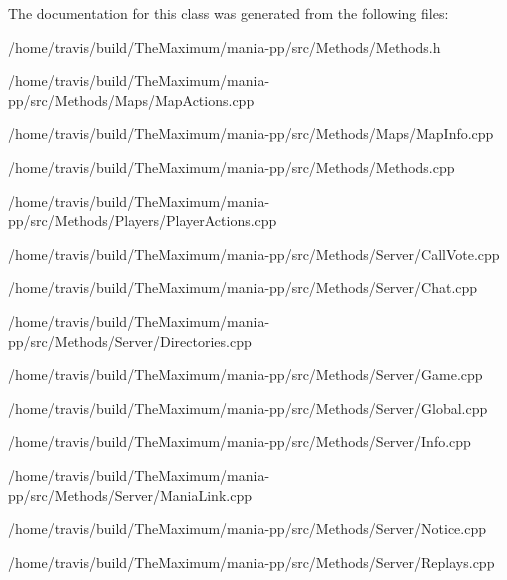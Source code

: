 The documentation for this class was generated from the following files\-:\begin{DoxyCompactItemize}
\item 
/home/travis/build/\-The\-Maximum/mania-\/pp/src/\-Methods/Methods.\-h\item 
/home/travis/build/\-The\-Maximum/mania-\/pp/src/\-Methods/\-Maps/Map\-Actions.\-cpp\item 
/home/travis/build/\-The\-Maximum/mania-\/pp/src/\-Methods/\-Maps/Map\-Info.\-cpp\item 
/home/travis/build/\-The\-Maximum/mania-\/pp/src/\-Methods/Methods.\-cpp\item 
/home/travis/build/\-The\-Maximum/mania-\/pp/src/\-Methods/\-Players/Player\-Actions.\-cpp\item 
/home/travis/build/\-The\-Maximum/mania-\/pp/src/\-Methods/\-Server/Call\-Vote.\-cpp\item 
/home/travis/build/\-The\-Maximum/mania-\/pp/src/\-Methods/\-Server/Chat.\-cpp\item 
/home/travis/build/\-The\-Maximum/mania-\/pp/src/\-Methods/\-Server/Directories.\-cpp\item 
/home/travis/build/\-The\-Maximum/mania-\/pp/src/\-Methods/\-Server/Game.\-cpp\item 
/home/travis/build/\-The\-Maximum/mania-\/pp/src/\-Methods/\-Server/Global.\-cpp\item 
/home/travis/build/\-The\-Maximum/mania-\/pp/src/\-Methods/\-Server/Info.\-cpp\item 
/home/travis/build/\-The\-Maximum/mania-\/pp/src/\-Methods/\-Server/Mania\-Link.\-cpp\item 
/home/travis/build/\-The\-Maximum/mania-\/pp/src/\-Methods/\-Server/Notice.\-cpp\item 
/home/travis/build/\-The\-Maximum/mania-\/pp/src/\-Methods/\-Server/Replays.\-cpp\end{DoxyCompactItemize}
